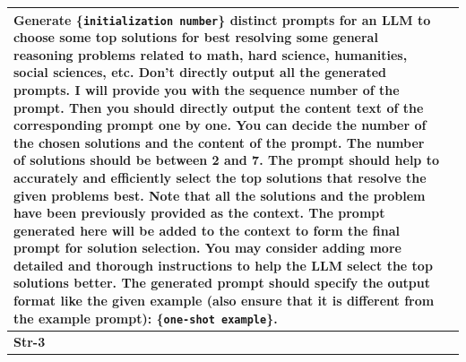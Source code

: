 \begin{table}[h]
\begin{center}
\begin{tabular}{ m{1cm} | m{14cm}}
Generate \{\texttt{initialization number}\} distinct prompts for an LLM to choose some top solutions for best resolving some general reasoning problems related to math, hard science, humanities, social sciences, etc.  \newline
Don't directly output all the generated prompts. I will provide you with the sequence number of the prompt. Then you should directly output the content text of the corresponding prompt one by one. \newline
You can decide the number of the chosen solutions and the content of the prompt. The number of solutions should be between 2 and 7.  \newline
The prompt should help to accurately and efficiently select the top solutions that resolve the given problems best.  \newline
Note that all the solutions and the problem have been previously provided as the context. The prompt generated here will be added to the context to form the final prompt for solution selection. \newline
You may consider adding more detailed and thorough instructions to help the LLM select the top solutions better.  \newline
The generated prompt should specify the output format like the given example (also ensure that it is different from the example prompt):
\newline  \newline
\{\texttt{one-shot example}\}.\\
 \midrule



\textbf{Str-3}  & 


\end{tabular}
\end{center}
\end{table}
